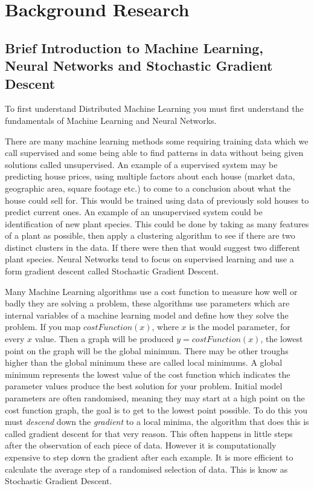 \clearpage
\section{Background Research}
\subsection{Brief Introduction to Machine Learning, Neural Networks and Stochastic Gradient Descent}
To first understand Distributed Machine Learning you must first understand the
fundamentals of Machine Learning and Neural Networks. 

There are many machine learning methods some requiring training data which we
call supervised and some being able to find patterns in data without being given
solutions called unsupervised. \cite{alpaydin2020introduction} An example of
a supervised system may be predicting house prices, using multiple factors
about each house (market data, geographic area, square footage etc.) to come to
a conclusion about what the house could sell for. This would be trained using
data of previously sold houses to predict current ones. An example of an
unsupervised system could be identification of new plant species. This could be
done by taking as many features of a plant as possible, then apply a clustering
algorithm to see if there are two distinct clusters in the data. If there were
then that would suggest two different plant species. Neural Networks tend to
focus on supervised learning and use a form gradient descent called Stochastic
Gradient Descent.

Many Machine Learning algorithms use a cost function to measure how well or
badly they are solving a problem, these algorithms use parameters which are
internal variables of a machine learning model and define how they solve the
problem. If you map \(costFunction(x)\), where \(x\) is the model parameter, for
every \(x\) value. Then a graph will be produced \(y = costFunction(x)\), the
lowest point on the graph will be the global minimum. There may be other troughs
higher than the global minimum these are called local minimums. A global minimum
represents the lowest value of the cost function which indicates the parameter
values produce the best solution for your problem. Initial model parameters are
often randomised, meaning they may start at a high point on the cost function
graph, the goal is to get to the lowest point possible. To do this you must
\textit{descend} down the \textit{gradient} to a local minima, the algorithm
that does this is called gradient descent for that very reason. This often
happens in little steps after the observation of each piece of data. However it
is computationally expensive to step down the gradient after each example. It is
more efficient to calculate the average step of a randomised selection of data.
This is know as Stochastic Gradient Descent.

